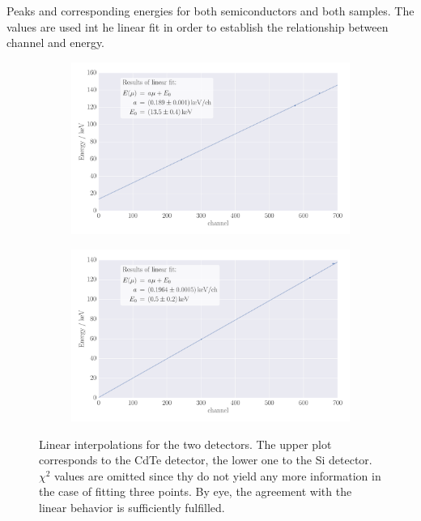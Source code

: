 \begin{table}[htdp]
    \centering
    \caption{
        Peaks and corresponding energies for both semiconductors 
        and both samples. The values are used int he linear fit 
        in order to establish the relationship between channel 
        and energy.
        }
    
    \label{tab:detector_peaks}
\end{table}

\begin{figure}
    \centering
    \begin{subfigure}[b]{\pltw}
        \includegraphics[width=1.0\linewidth]{figures/detector_calibration_CdTe}
        \caption{}
        \label{fig:detector_calibration_CdTe}
    \end{subfigure}
    \begin{subfigure}[b]{\pltw}
        \includegraphics[width=1.0\linewidth]{figures/detector_calibration_Si}
        \caption{}
        \label{fig:detector_calibration_Si}
    \end{subfigure}
    \caption{
        Linear interpolations for the two detectors. The upper plot 
        corresponds to the CdTe detector, the lower one to the Si detector. 
        $\chi^2$ values are omitted since thy do not yield any more information 
        in the case of fitting three points. By eye, the agreement with the linear 
        behavior is sufficiently fulfilled. 
        }
    \label{fig:detector_calibration}
\end{figure}

